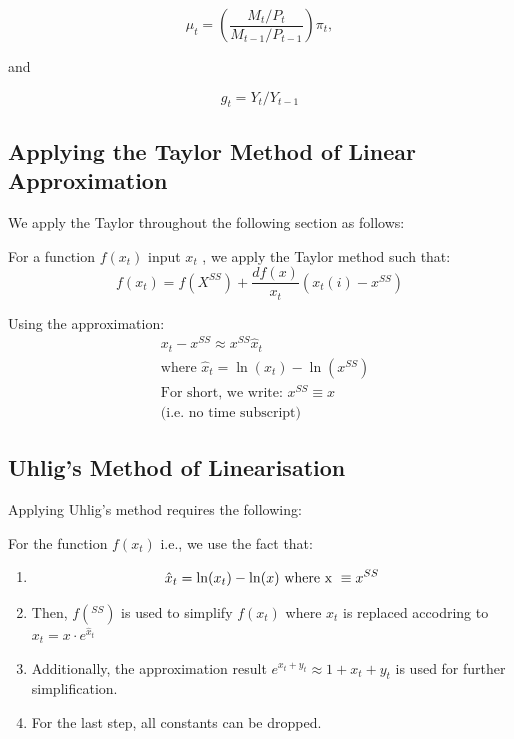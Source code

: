 \documentclass[11pt,preprint, authoryear]{elsarticle}
\numberwithin{equation}{section}
\numberwithin{figure}{section}
\numberwithin{table}{section}
\begin{document}
\[\mu_{t}=\left(\frac{M_{t} / P_{t}}{M_{t-1} / P_{t-1}}\right) \pi_{t}, \tag{17*}\]

and

\[g_{t}=Y_{t} / Y_{t-1} \tag{18*}\]

\hypertarget{applying-the-taylor-method-of-linear-approximation}{%
\subsection{Applying the Taylor Method of Linear
Approximation}\label{applying-the-taylor-method-of-linear-approximation}}

We apply the Taylor throughout the following section as follows:

For a function \(f(x_t)\) input \(x_t\) , we apply the Taylor method
such that: \[f(x_t) = f(X^{SS}) + \frac{df(x)}{x_t} (x_t(i) - x^{SS})\]

Using the approximation: \[\begin{aligned}
&x_t - x^{SS} \approx x^{SS} \hat{x}_{t}
\\
&\text{where } \hat{x}_{t} = \ln(x_t)-\ln(x^{SS})
\\
&\text{For short, we write: } x^{SS} \equiv x
\\
&\text{(i.e. no time subscript)}
\end{aligned}\]

\hypertarget{uhligs-method-of-linearisation}{%
\subsection{Uhlig's Method of
Linearisation}\label{uhligs-method-of-linearisation}}

Applying Uhlig's method requires the following:

\newpage

For the function \(f(x_t)\) i.e., we use the fact that:

\begin{enumerate}
\def\labelenumi{\arabic{enumi}.}
\item
  \[\hat{x}_t = \ln(x_t) - \ln(x) \\
  \text{ where x } \equiv x^{SS}\]
\item
  Then, \(f(^{SS})\) is used to simplify \(f(x_t)\) where \(x_t\) is
  replaced accodring to \(x_t = x \cdot e^{\hat{x}_t}\)
\item
  Additionally, the approximation result
  \(e^{x_t+y_t} \approx 1+x_t+y_t\) is used for further simplification.
\item
  For the last step, all constants can be dropped.
\end{enumerate}
\end{document}
